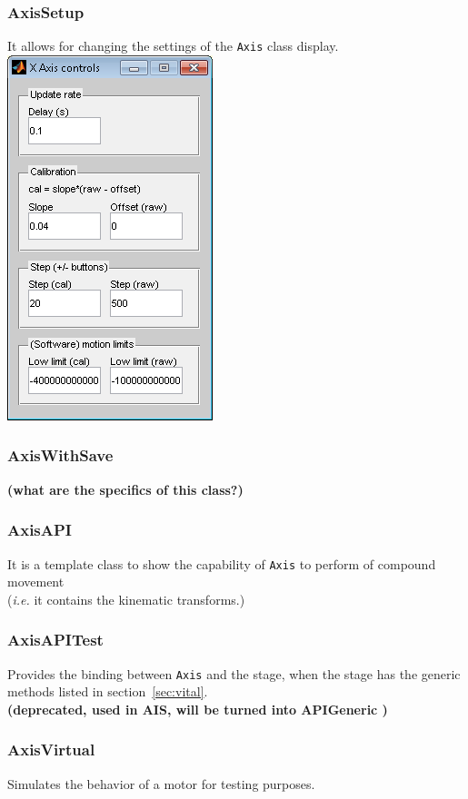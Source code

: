 \documentclass[10pt,letter,twoside]{report}
\newcommand{\temp}[1] {{\bf (#1)}}
\begin{document}
\subsubsection{AxisSetup}
It allows for changing the settings of the \verb!Axis! class display.\\
\includegraphics[scale=0.5]{img/met5gui-AxisSetup.png}
\subsubsection{AxisWithSave}
\temp{what are the specifics of this class?}
\subsubsection{AxisAPI}
It is a template class to show the capability of \verb!Axis! to perform of compound movement\\
(\textit{i.e.} it contains the kinematic transforms.)
\subsubsection{AxisAPITest}
Provides the binding between \verb!Axis! and the stage, when the stage has the generic methods listed in section~\ref{sec:vital}.\\
\temp{deprecated, used in AIS, will be turned into APIGeneric }
\subsubsection{AxisVirtual}
Simulates the behavior of a motor for testing purposes.
\end{document}
